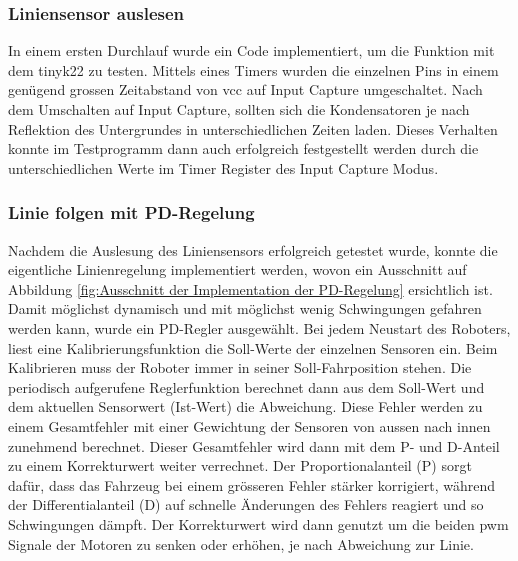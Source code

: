 \subsubsection{Liniensensor auslesen}
\label{Liniensensor auslesen}

In einem ersten Durchlauf wurde ein Code implementiert, um die Funktion mit dem \gls{tinyk22} zu testen. Mittels eines Timers wurden die einzelnen Pins in einem genügend grossen Zeitabstand von \acrfull{vcc} auf Input Capture umgeschaltet. Nach dem Umschalten auf Input Capture, sollten sich die Kondensatoren je nach Reflektion des Untergrundes in unterschiedlichen Zeiten laden. Dieses Verhalten konnte im Testprogramm dann auch erfolgreich festgestellt werden durch die unterschiedlichen Werte im Timer Register des Input Capture Modus.


\subsubsection{Linie folgen mit PD-Regelung}
\label{Linie folgen mit PD-Regelung}

Nachdem die Auslesung des Liniensensors erfolgreich getestet wurde, konnte die eigentliche Linienregelung implementiert werden, wovon ein Ausschnitt auf Abbildung \ref{fig:Ausschnitt der Implementation der PD-Regelung} ersichtlich ist. Damit möglichst dynamisch und mit möglichst wenig Schwingungen gefahren werden kann, wurde ein PD-Regler ausgewählt. Bei jedem Neustart des Roboters, liest eine Kalibrierungsfunktion die Soll-Werte der einzelnen Sensoren ein. Beim Kalibrieren muss der Roboter immer in seiner Soll-Fahrposition stehen. Die periodisch aufgerufene Reglerfunktion berechnet dann aus dem Soll-Wert und dem aktuellen Sensorwert (Ist-Wert) die Abweichung. Diese Fehler werden zu einem Gesamtfehler mit einer Gewichtung der Sensoren von aussen nach innen zunehmend berechnet. Dieser Gesamtfehler wird dann mit dem P- und D-Anteil zu einem Korrekturwert weiter verrechnet. Der Proportionalanteil (P) sorgt dafür, dass das Fahrzeug bei einem grösseren Fehler stärker korrigiert, während der Differentialanteil (D) auf schnelle Änderungen des Fehlers reagiert und so Schwingungen dämpft. Der Korrekturwert wird dann genutzt um die beiden \acrfull{pwm} Signale der Motoren zu senken oder erhöhen, je nach Abweichung zur Linie.

